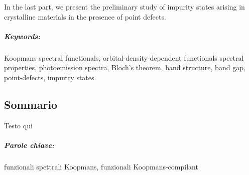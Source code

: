 In the last part, we present the preliminary study of impurity states arising in crystalline materials in the presence of point defects.

%
\paragraph{Keywords:}
Koopmans spectral functionals,
orbital-density-dependent functionals
spectral properties,
photoemission spectra,
Bloch's theorem,
band structure,
band gap,
point-defects,
impurity states.
%

\begin{otherlanguage}{italian}
\cleardoublepage
\chapter*{Sommario}
\vspace{2cm}
%
Testo qui
%
\paragraph{Parole chiave:}
funzionali spettrali Koopmans,
funzionali Koopmans-compilant
%
\end{otherlanguage}

\endgroup			
\vfill
